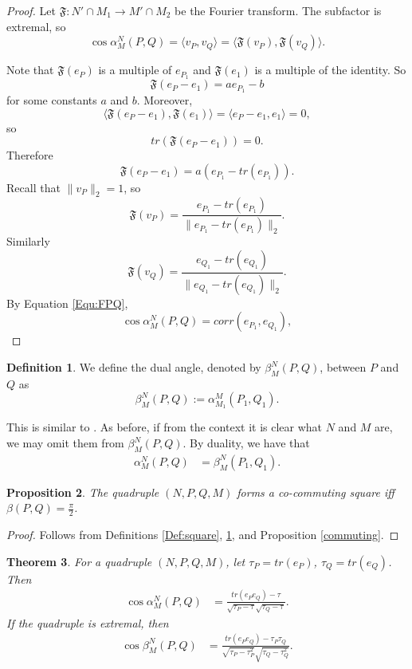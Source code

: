 \documentclass[11pt,letterpaper]{amsart}
\newtheorem{theorem}{Theorem}[section]
\newtheorem{proposition}[theorem]{Proposition}
\theoremstyle{definition}
\newtheorem{definition}[theorem]{Definition}
\theoremstyle{remark}
\newcommand{\F}{\mathfrak{F}}
\begin{document}
\begin{proof}
Let $\F: N' \cap M_1\to M' \cap M_2$ be the Fourier transform. The subfactor is extremal, so  
\begin{equation}\label{Equ:FPQ}
\cos \alpha^N_M(P, Q) =\langle v_P,v_Q\rangle=\langle \F(v_P),\F(v_Q)\rangle.
\end{equation}

Note that 
$\F(e_P)$ is a multiple of $e_{P_1}$ and $\F(e_1)$ is a multiple of the identity. So 
$$\F(e_P-e_1)=a e_{P_1}-b $$
for some constants $a$ and $b$.
Moreover,
$$\langle \F(e_P-e_1), \F(e_1)\rangle=\langle e_P-e_1, e_1\rangle=0,$$
so 
$$tr(\F(e_P-e_1))=0.$$ 
Therefore 
$$\F(e_P-e_1)=a(e_{P_1}-tr(e_{P_1})).$$ 
Recall that $\|v_P\|_2=1$, so 
$$\F(v_P)=\frac{e_{P_1}-tr(e_{P_1})}{\|e_{P_1}-tr(e_{P_1})\|_2}.$$
Similarly 
$$\F(v_Q)=\frac{e_{Q_1}-tr(e_{Q_1})}{\|e_{Q_1}-tr(e_{Q_1})\|_2}.$$
By Equation \eqref{Equ:FPQ},
\begin{equation*}
\cos \alpha^N_M(P, Q)= corr(e_{P_1},e_{Q_1}),
\end{equation*}

\end{proof}


\begin{definition}\label{beta}
We define the dual angle, denoted by $\beta^N_M(P,Q)$, between $P$ and $Q$ as 
$$\beta^N_M(P,Q):=\alpha^M_{M_1}(P_1, Q_1).$$
\end{definition}
This is similar to \cite{SW}.  As before, if from the context it is clear what $N$ and $M$ are, we may omit them from ${\beta}^N_M(P,Q).$
By duality, we have that 
\begin{align}\label{Equ:dual}
\alpha^N_M(P,Q)&=\beta^N_M(P_1,Q_1).
\end{align}
 
\begin{proposition}\label{co-commuting}
The quadruple $(N,P,Q,M)$ forms a co-commuting square iff $\beta(P,Q)= \frac{\pi}{2}$.
\end{proposition}
\begin{proof}
Follows from Definitions \ref{Def:square}, \ref{beta}, and Proposition \ref{commuting}. 
\end{proof} 
 
\begin{theorem}\label{Thm: alpha-beta}
For a quadruple $(N,P,Q,M)$, let $\tau_P=tr(e_P)$, $\tau_Q=tr(e_Q)$. Then
\begin{align}\label{Equ:alpha}
\cos \alpha^N_M(P, Q)  &=\frac{tr(e_Pe_Q)-\tau}{\sqrt{\tau_P-\tau}\sqrt{\tau_Q-\tau}}.
\end{align}
If the quadruple is extremal, then
\begin{align}\label{Equ:beta}
\cos \beta^N_M(P, Q) &= \frac{tr(e_Pe_Q)-\tau_P\tau_Q}{\sqrt{\tau_P-\tau_P^2}\sqrt{\tau_Q-\tau_Q^2}}.
\end{align}
\end{theorem}
\end{document}
